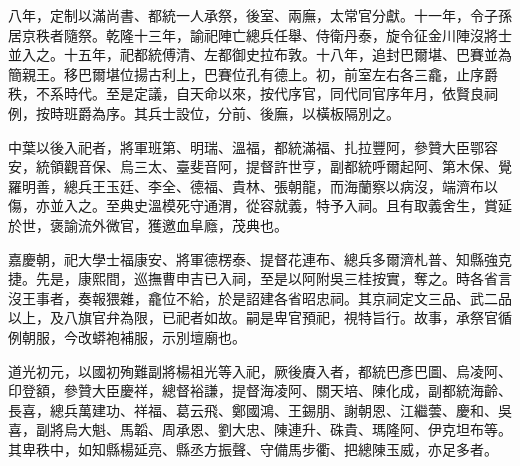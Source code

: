 \begin{pinyinscope}
八年，定制以滿尚書、都統一人承祭，後室、兩廡，太常官分獻。十一年，令子孫居京秩者隨祭。乾隆十三年，諭祀陣亡總兵任舉、侍衛丹泰，旋令征金川陣沒將士並入之。十五年，祀都統傅清、左都御史拉布敦。十八年，追封巴爾堪、巴賽並為簡親王。移巴爾堪位揚古利上，巴賽位孔有德上。初，前室左右各三龕，止序爵秩，不系時代。至是定議，自天命以來，按代序官，同代同官序年月，依賢良祠例，按時班爵為序。其兵士設位，分前、後廡，以橫板隔別之。

中葉以後入祀者，將軍班第、明瑞、溫福，都統滿福、扎拉豐阿，參贊大臣鄂容安，統領觀音保、烏三太、臺斐音阿，提督許世亨，副都統呼爾起阿、第木保、覺羅明善，總兵王玉廷、李全、德福、貴林、張朝龍，而海蘭察以病沒，端濟布以傷，亦並入之。至典史溫模死守通渭，從容就義，特予入祠。且有取義舍生，賞延於世，褒諭流外微官，獲邀血阜廕，茂典也。

嘉慶朝，祀大學士福康安、將軍德楞泰、提督花連布、總兵多爾濟札普、知縣強克捷。先是，康熙間，巡撫曹申吉已入祠，至是以阿附吳三桂按實，奪之。時各省言沒王事者，奏報猥雜，龕位不給，於是詔建各省昭忠祠。其京祠定文三品、武二品以上，及八旗官弁為限，已祀者如故。嗣是卑官預祀，視特旨行。故事，承祭官循例朝服，今改蟒袍補服，示別壇廟也。

道光初元，以國初殉難副將楊祖光等入祀，厥後賡入者，都統巴彥巴圖、烏凌阿、印登額，參贊大臣慶祥，總督裕謙，提督海凌阿、關天培、陳化成，副都統海齡、長喜，總兵萬建功、祥福、葛云飛、鄭國鴻、王錫朋、謝朝恩、江繼蕓、慶和、吳喜，副將烏大魁、馬韜、周承恩、劉大忠、陳連升、硃貴、瑪隆阿、伊克坦布等。其卑秩中，如知縣楊延亮、縣丞方振聲、守備馬步衢、把總陳玉威，亦足多者。


\end{pinyinscope}
